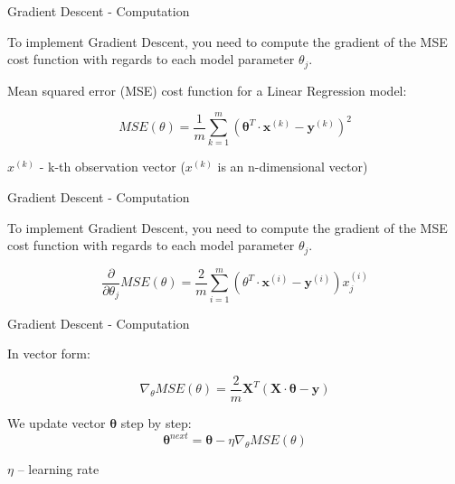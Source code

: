 \documentclass{beamer}
\begin{document}

\begin{frame}
{\centerline{Gradient Descent -  Computation }}

To implement Gradient Descent, you need to compute the gradient of the MSE cost function with regards to each model parameter $\theta_j$.

Mean squared error (MSE) cost function for a Linear Regression model:

$$MSE (\theta) = \frac{1}{m}\sum_{k=1}^{m} (\boldsymbol \theta^T \cdot \boldsymbol x^{(k)} - \boldsymbol y^{(k)})^2$$

$x^{(k)}$ - k-th observation vector ($x^{(k)}$ is an n-dimensional vector)



\end{frame}


\begin{frame}
{\centerline{Gradient Descent -  Computation }}


To implement Gradient Descent, you need to compute the gradient of the MSE cost function with regards to each model parameter $\theta_j$.

$$\frac{\partial}{\partial \theta_j}MSE(\theta) = \frac{2}{m} \sum_{i=1}^{m}(\theta^T \cdot \boldsymbol x^{(i)} - \boldsymbol y^{(i)}  ) x_j^{(i)}$$
\end{frame}


\begin{frame}
{\centerline{Gradient Descent -  Computation  }}
In vector form:

$$\nabla_{\theta} MSE(\theta) = \frac{2}{m} \boldsymbol X^T (\boldsymbol X \cdot \boldsymbol \theta - \boldsymbol y)$$

We update vector $\boldsymbol \theta$ step by step:
$$\boldsymbol \theta^{next} = \boldsymbol \theta - \eta \nabla_{\theta} MSE(\theta) $$

$\eta$ -- learning rate
\end{frame}
\end{document}
